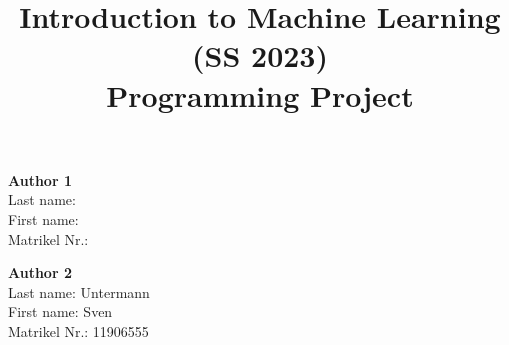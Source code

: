 \documentclass[a4, 10 pt, conference]{ieeeconf}  %
\title{\LARGE \bf
Introduction to Machine Learning (SS 2023)\\ Programming Project
\vspace{-3em}
}
\begin{document}
\maketitle
\vspace{-3em}
\thispagestyle{empty}
\pagestyle{empty}

\begin{strip}
\begin{tcolorbox}[
size=tight,
colback=white,
boxrule=0.2mm,
left=3mm,right=3mm, top=3mm, bottom=1mm
]
{\begin{multicols}{3}%

\textbf{Author 1}       \\
Last name:              \\  %
First name:             \\  %
Matrikel Nr.:               \\  %

\columnbreak

\textbf{Author 2}       \\ 
Last name:  Untermann            \\  %
First name:   Sven          \\  %
Matrikel Nr.:   11906555           \\  %

\columnbreak


\end{multicols}}
\end{tcolorbox}
\end{strip}




\end{document}

